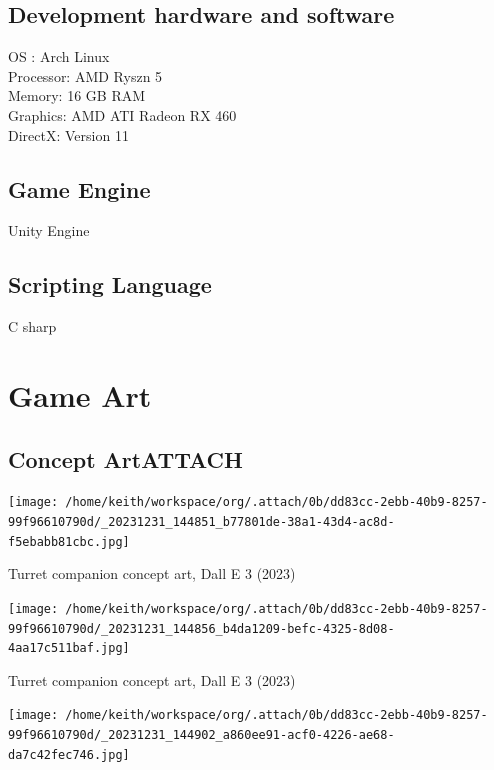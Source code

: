 \documentclass{article}
\begin{document}
\subsection{Development hardware and software}
\label{sec:org8cd9ab8}
OS : Arch Linux \\[0pt]
Processor: AMD Ryszn 5 \\[0pt]
Memory: 16 GB RAM \\[0pt]
Graphics: AMD ATI Radeon RX 460 \\[0pt]
DirectX: Version 11 \\[0pt]
\subsection{Game Engine}
\label{sec:orgd3addaf}
Unity Engine
\subsection{Scripting Language}
\label{sec:org00c46bd}
C sharp
\section{Game Art}
\label{sec:org2b7eddb}
\subsection{Concept Art\hfill{}\textsc{ATTACH}}
\label{sec:org73dcdff}
\begin{center}
\texttt{[image: /home/keith/workspace/org/.attach/0b/dd83cc-2ebb-40b9-8257-99f96610790d/\_20231231\_144851\_b77801de-38a1-43d4-ac8d-f5ebabb81cbc.jpg]}
\end{center}

Turret companion concept art, Dall E 3 (2023)



\begin{center}
\texttt{[image: /home/keith/workspace/org/.attach/0b/dd83cc-2ebb-40b9-8257-99f96610790d/\_20231231\_144856\_b4da1209-befc-4325-8d08-4aa17c511baf.jpg]}
\end{center}

Turret companion concept art, Dall E 3 (2023)



\begin{center}
\texttt{[image: /home/keith/workspace/org/.attach/0b/dd83cc-2ebb-40b9-8257-99f96610790d/\_20231231\_144902\_a860ee91-acf0-4226-ae68-da7c42fec746.jpg]}
\end{center}
\end{document}
